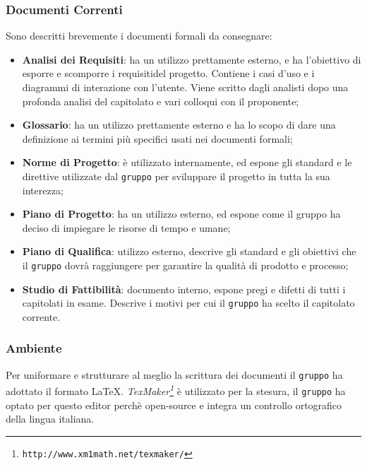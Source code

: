 \subsubsection{Documenti Correnti}
Sono descritti brevemente i documenti formali da consegnare:
\begin{itemize}
	\item \textbf{Analisi dei Requisiti}: ha un utilizzo prettamente esterno, e ha l'obiettivo di esporre e scomporre i requisiti\glossario del progetto. Contiene i casi d'uso e i diagrammi di interazione con l'utente. Viene scritto dagli analisti dopo una profonda analisi del capitolato e vari colloqui con il proponente; 
	\item \textbf{Glossario}: ha un utilizzo prettamente esterno e ha lo scopo di dare una definizione ai termini più specifici usati nei documenti formali;
	\item \textbf{Norme di Progetto}: è utilizzato internamente, ed espone gli standard e le direttive utilizzate dal \texttt{gruppo} per sviluppare il progetto in tutta la sua interezza;
	\item \textbf{Piano di Progetto}: ha un utilizzo esterno, ed espone come il gruppo ha deciso di impiegare le risorse di tempo e umane;
	\item \textbf{Piano di Qualifica}: utilizzo esterno, descrive gli standard e gli obiettivi che il \texttt{gruppo} dovrà raggiungere per garantire la qualità di prodotto e processo;
	\item \textbf{Studio di Fattibilità}: documento interno, espone pregi e difetti di tutti i capitolati in esame. Descrive i motivi per cui il \texttt{gruppo} ha scelto il capitolato corrente.
\end{itemize}

\subsubsection{Ambiente}
Per uniformare e strutturare al meglio la scrittura dei documenti il \texttt{gruppo} ha adottato il formato \LaTeX. 
\textit{TexMaker\footnote{\texttt{http://www.xm1math.net/texmaker/}}} è utilizzato per la stesura, il \texttt{gruppo} ha optato per questo editor perchè open-source e integra un controllo ortografico della lingua italiana.





